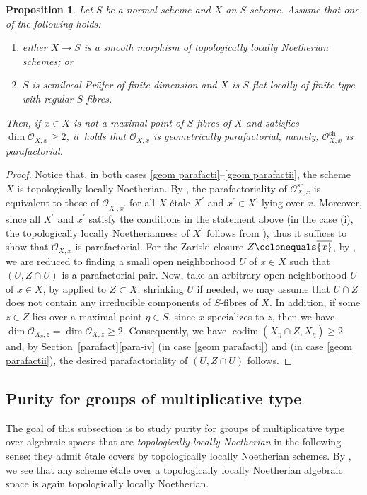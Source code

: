 \documentclass[JEP,XML,SOM,Unicode,published]{cedram}
\newenvironment{enumeratei}
{\bgroup\def\theenumi{\roman{enumi}}\def\theenumii{\arabic{enumii}}\begin{enumerate}}
{\end{enumerate}\egroup}
\newcommand{\sO}{\mathscr{O}}
\let\ov\overline
\let\ce\colonequals
\newcommand{\pr}{^{\prime}}
\newcommand{\sh}{\mathrm{sh}}
\DeclareMathOperator{\codim}{codim}
\newcommand{\bpf}{\begin{proof}}
\newcommand{\epf}{\end{proof}}
\newcommand{\bprop}{\begin{prop}}
\newcommand{\eprop}{\end{prop}}
\newcommand{\benumr}{\begin{enumeratei}}
\newcommand{\eenumr}{\end{enumeratei}}
\theoremstyle{plain}
\newtheorem{prop}[subsection]{Proposition}
\theoremstyle{definition}
\begin{document}
\bprop \label{geom parafact}
Let $S$ be a normal scheme and $X$ an $S$-scheme. Assume that one of the following holds:
\benumr
\item\label{geom parafacti} either $X\to S$ is a smooth morphism of topologically locally Noetherian schemes; or
\item\label{geom parafactii} $S$ is semilocal Prüfer of finite dimension and $X$ is $S$-flat locally of finite type with regular $S$-fibres.
\eenumr
\noindent
Then, if $x\in X$ is not a maximal point of $S$-fibres of $X$ and satisfies $\dim \sO_{X,x}\geq 2$, it~holds that
$\sO_{X,x}$ is geometrically parafactorial, namely, $\sO^{\sh}_{X,x}$ is parafactorial.
\eprop
\bpf
Notice that, in both cases \eqref{geom parafacti}--\eqref{geom parafactii}, the scheme $X$ is topologically locally Noetherian. By , the parafactoriality of $\sO_{X,x}^{\sh}$ is equivalent to those of $ \sO_{X\pr,x\pr}$ for all $X$-étale $X\pr$ and $x\pr\in X\pr$ lying over $x$. Moreover, since all $X\pr$ and $x\pr$ satisfy the conditions in the statement above (in the case (i), the topologically locally Noetherianness of $X\pr$ follows from \cite[Lem.\,6.6.10(3)]{BS15}), thus it suffices to show that $\sO_{X,x}$ is parafactorial.
For the Zariski closure $Z\ce \ov{\{x\}}$, by , we are reduced to finding a small open neighborhood $U$ of $x\in X$ such that $(U, Z\cap U)$ is a parafactorial pair.
Now, take an arbitrary open neighborhood $U$ of $x\in X$, by \cite[Prop.\,9.5.3]{EGAIV3} applied to $Z\subset X$, shrinking $U$ if needed, we may assume that $U\cap Z$ does not contain any irreducible components of $S$-fibres of $X$.
In addition, if some $z\in Z$ lies over a maximal point $\eta\in S$, since $x$ specializes to $z$, then we have $\dim \sO_{X_{\eta},z}= \dim \sO_{X,z}\geq 2$. Consequently, we have $\codim(X_{\eta}\cap Z, X_{\eta})\geq 2$ and, by Section~\ref{parafact}\eqref{para-iv} (in case \eqref{geom parafacti}) and  (in case \eqref{geom parafactii}), the desired parafactoriality of $(U,Z\cap U)$ follows.
\epf

\subsection{Purity for groups of multiplicative type}\label{subsection-purity of mult}
The goal of this subsection is to study purity for groups of multiplicative type over algebraic spaces that are \emph{topologically locally Noetherian} in the following sense: they admit étale covers by topologically locally Noetherian schemes. By \cite[Lem.\,6.6.10(3)]{BS15}, we see that any scheme étale over a topologically locally Noetherian algebraic space is again topologically locally Noetherian.
\end{document}
